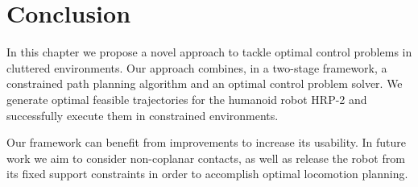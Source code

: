 \section{Conclusion}
In this chapter we propose a novel approach to tackle optimal control
problems in cluttered environments. Our approach combines, in a
two-stage framework, a constrained path planning algorithm and an
optimal control problem solver. We generate optimal feasible
trajectories for the humanoid robot HRP-2 and successfully execute
them in constrained environments.

Our framework can benefit from improvements to increase its
usability. In future work we aim to consider non-coplanar contacts, as
well as release the robot from its fixed support constraints in order
to accomplish optimal locomotion planning.
